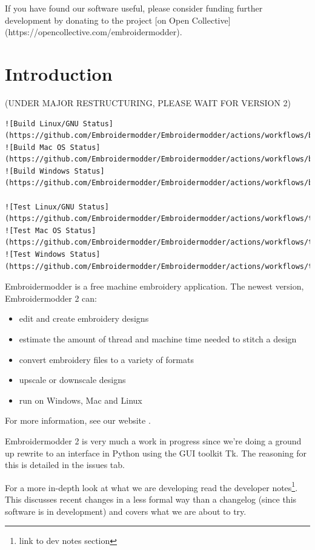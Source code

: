 \documentclass[a4paper, 11pt]{report}
\begin{document}
If you have found our software useful, please consider funding further development by donating to the project [on Open Collective](https://opencollective.com/embroidermodder).

\section{Introduction}

(UNDER MAJOR RESTRUCTURING, PLEASE WAIT FOR VERSION 2)

\begin{verbatim}
![Build Linux/GNU Status](https://github.com/Embroidermodder/Embroidermodder/actions/workflows/build_linux_gnu.yml/badge.svg)
![Build Mac OS Status](https://github.com/Embroidermodder/Embroidermodder/actions/workflows/build_macos.yml/badge.svg)
![Build Windows Status](https://github.com/Embroidermodder/Embroidermodder/actions/workflows/build_windows.yml/badge.svg)

![Test Linux/GNU Status](https://github.com/Embroidermodder/Embroidermodder/actions/workflows/test_linux_gnu.yml/badge.svg)
![Test Mac OS Status](https://github.com/Embroidermodder/Embroidermodder/actions/workflows/test_macos.yml/badge.svg)
![Test Windows Status](https://github.com/Embroidermodder/Embroidermodder/actions/workflows/test_windows.yml/badge.svg)
\end{verbatim}

Embroidermodder is a free machine embroidery application.
The newest version, Embroidermodder 2 can:

\begin{itemize}
\item edit and create embroidery designs
\item estimate the amount of thread and machine time needed to stitch a design
\item convert embroidery files to a variety of formats
\item upscale or downscale designs
\item run on Windows, Mac and Linux
\end{itemize}

For more information, see our website \cite{thewebsite}.

Embroidermodder 2 is very much a work in progress since we're doing a ground up rewrite to an interface in Python using the GUI toolkit Tk. The reasoning for this is detailed in the issues tab.

For a more in-depth look at what we are developing read the developer notes\footnote{link to dev notes section}. This discusses recent changes in a less formal way than a changelog (since this software is in development) and covers what we are about to try.
\end{document}
